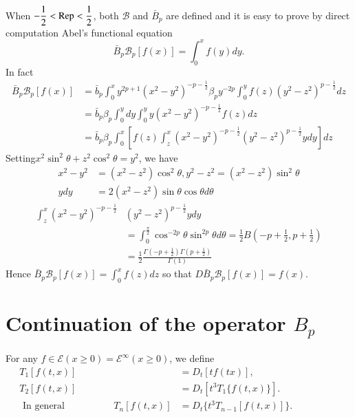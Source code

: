 When $- \dfrac{1}{2} < \operatorname{Rep}< \dfrac{1}{2}$, both $\mathscr{B}$ and
$\bar{B}_p$ are defined and it is easy to prove by direct computation
Abel's functional equation  
$$
\bar{B}_p \mathscr{B}_p [ f(x)] = \int^x _0 f (y) dy. 
$$
In fact   
\begin{align*}
\bar{B}_p \mathscr{B}_p [ f (x) ] & = \bar{b}_p
  \int^x_0 y^{ 2 p +1}(x^2 - y^2)^{ - p - \frac{1}{2}}\beta
  _p y^{-2p}   \int^y_0 f(z) (y^2 - z^2)^{p - \frac{1}{2}} dz\\ 
  & = \bar{b}_p \beta_p \int^y_0 dy \int^y_0 y (x^2 - y^2 )^{ - p -
    \frac{1}{2}} f (z)dz \\ 
  & = \bar{b}_p \beta_p \int^x_0 [ f (z) \int^x_z (x^2 - y^2)^{ - p -
      \frac{1}{2}} (y^2 - z^2 )^{p-\frac{1}{2}} ydy ] dz  
\end{align*}
Setting\pageoriginale $x^2 \sin ^2 \theta + z^2 \cos^2 \theta = y^2 $,  we have 
\begin{align*}
x^2 - y^2 & = (x^2 - z^2 )\cos ^2 \theta,  y^2 - z^2 = (x^2 - z^2)
\sin^2 \theta\\ 
y dy & = 2(x^2 - z^2) \sin \theta \cos \theta d \theta
\end{align*}
\begin{align*}
  \int^x_z (x^2 - y^2)^{ - p - \frac{1}{2}} & (y^2 - z^2)^{ p  - \frac{1}{2}} ydy\\ 
  & = \int^{\frac{\pi}{2}} _ 0 \cos ^{ - 2 p} \theta \sin^{2p} \theta
  d \theta = \frac{1}{2} B \left(- p + \frac{1}{2}, p + \frac{1}{2}\right) \\ 
  & = \frac{1}{2} \frac{\Gamma \left(- p + \frac{1}{2}\right)\Gamma  \left(p +
    \frac{1}{2}\right)}{\Gamma (1)} 
\end{align*}
Hence $\bar{B}_p \mathscr{B}_p [ f (x) ] = \int^x _0 f (z) dz $ so
that $D \bar{B}_p \mathscr{B}_p [ f(x)]  = f(x)$.  

\section{Continuation of the operator $B_p$}\label{part1:chap3:sec2}

For any $f \in \mathscr{E}(x \geq 0) = \mathscr{E} ^\infty (x \geq
0)$, we define  
\begin{align*}
  T_1 [ f (t, x ) ] & = D_t [ t f (tx)], \\
  T_2 [ f(t, x )] & = D_t [ t^3 T_1 \{ f (t, x)\} ]. \\
  \text{ In general } \hspace{2cm} T_n [ f (t, x ) ] & = D_t \{ t^3
  T_{ n -1} [ f 
    (t, x )] \}.\hspace{2cm} 
\end{align*}

